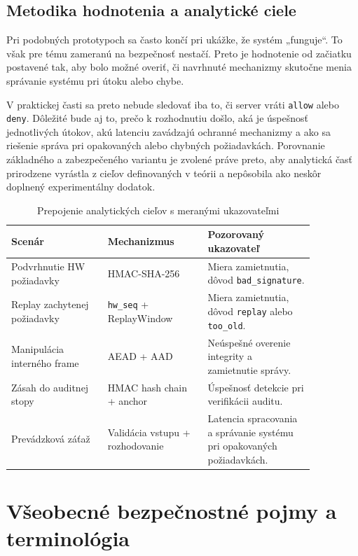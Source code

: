 \documentclass[journal,a4paper,onecolumn]{IEEEtran}
\begin{document}
\subsection{Metodika hodnotenia a analytické ciele}

Pri podobných prototypoch sa často končí pri ukážke, že systém „funguje“. To však pre tému zameranú na bezpečnosť nestačí. Preto je hodnotenie od začiatku postavené tak, aby bolo možné overiť, či navrhnuté mechanizmy skutočne menia správanie systému pri útoku alebo chybe.

V praktickej časti sa preto nebude sledovať iba to, či server vráti \texttt{allow} alebo \texttt{deny}. Dôležité bude aj to, prečo k rozhodnutiu došlo, aká je úspešnosť jednotlivých útokov, akú latenciu zavádzajú ochranné mechanizmy a ako sa riešenie správa pri opakovaných alebo chybných požiadavkách. Porovnanie základného a zabezpečeného variantu je zvolené práve preto, aby analytická časť prirodzene vyrástla z cieľov definovaných v teórii a nepôsobila ako neskôr doplnený experimentálny dodatok.


\begin{table}[!ht]
\renewcommand{\arraystretch}{1.3}
\centering
\caption{Prepojenie analytických cieľov s meranými ukazovateľmi}
\label{tab:analytics_goals}
\small
\begin{tabular}{p{0.27\linewidth} p{0.29\linewidth} p{0.30\linewidth}}
\toprule
\textbf{Scenár} & \textbf{Mechanizmus} & \textbf{Pozorovaný ukazovateľ} \\
\midrule
Podvrhnutie HW požiadavky & HMAC-SHA-256 & Miera zamietnutia, dôvod \texttt{bad\_signature}. \\
Replay zachytenej požiadavky & \texttt{hw\_seq} + ReplayWindow & Miera zamietnutia, dôvod \texttt{replay} alebo \texttt{too\_old}. \\
Manipulácia interného frame & AEAD + AAD & Neúspešné overenie integrity a zamietnutie správy. \\
Zásah do auditnej stopy & HMAC hash chain + anchor & Úspešnosť detekcie pri verifikácii auditu. \\
Prevádzková záťaž & Validácia vstupu + rozhodovanie & Latencia spracovania a správanie systému pri opakovaných požiadavkách. \\
\bottomrule
\end{tabular}
\normalsize
\end{table}

\section{Všeobecné bezpečnostné pojmy a terminológia}
\end{document}
